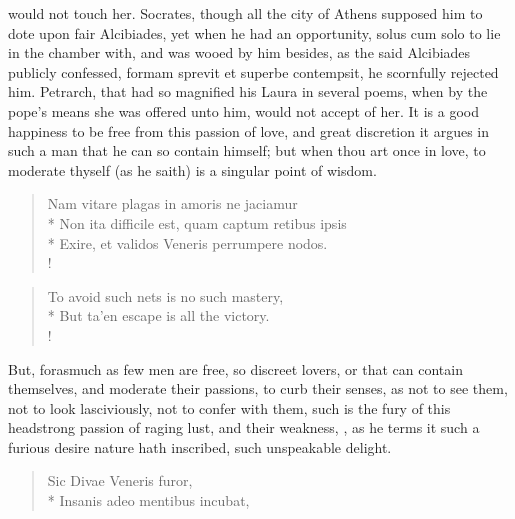would not touch her. Socrates, though all the city of Athens supposed
him to dote upon fair Alcibiades, yet when he had an opportunity,
solus cum solo to lie in the chamber with, and was wooed by him
besides, as the said Alcibiades publicly confessed, formam
sprevit et superbe contempsit, he scornfully rejected him. Petrarch,
that had so magnified his Laura in several poems, when by the pope's
means she was offered unto him, would not accept of her. It is a
good happiness to be free from this passion of love, and great
discretion it argues in such a man that he can so contain himself; but
when thou art once in love, to moderate thyself (as he saith) is a
singular point of wisdom.
%
\begin{latin}%
\begin{verse}%
Nam vitare plagas in amoris ne jaciamur\\*
Non ita difficile est, quam captum retibus ipsis\\*
Exire, et validos Veneris perrumpere nodos.\\!
\end{verse}%
\end{latin}%
\translationrule%
\begin{verse}%
To avoid such nets is no such mastery,\\*
But ta'en escape is all the victory.\\!
\end{verse}%
%

But, forasmuch as few men are free, so discreet lovers, or that can
contain themselves, and moderate their passions, to curb their senses,
as not to see them, not to look lasciviously, not to confer with them,
such is the fury of this headstrong passion of raging lust, and their
weakness, , as he terms it such
a furious desire nature hath inscribed, such unspeakable delight.

\begin{latin}%
\begin{verse}%
Sic Divae Veneris furor,\\*
Insanis adeo mentibus incubat,
\end{verse}%
\end{latin}%

